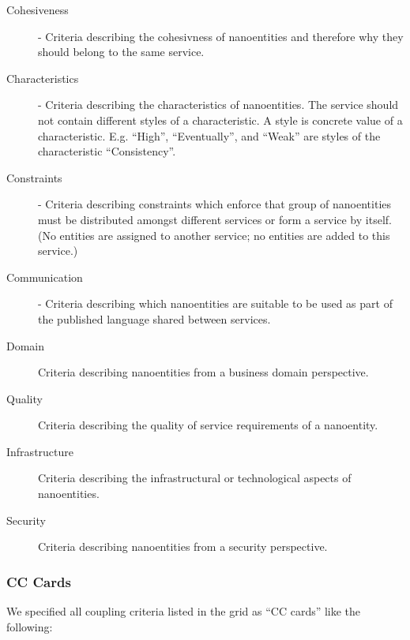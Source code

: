 \begin{description}
	\item[Cohesiveness] - Criteria describing the cohesivness of nanoentities and  therefore why they should belong to the same service. 
	\item[Characteristics] - Criteria describing the characteristics of nanoentities. The service should not contain different styles of a characteristic. A style is concrete value of a characteristic. E.g. \enquote{High}, \enquote{Eventually}, and \enquote{Weak} are styles of the characteristic \enquote{Consistency}.
	\item[Constraints] - Criteria describing constraints which enforce that group of nanoentities must be distributed amongst different services or form a service by itself. (No entities are assigned to another service; no entities are added to this service.)
	\item[Communication] - Criteria describing which nanoentities are suitable to be used as part of the published language shared between services. 
	\item[Domain] Criteria describing nanoentities from a business domain perspective.
	\item[Quality] Criteria describing the quality of service requirements of a nanoentity.  
	\item[Infrastructure] Criteria describing the infrastructural or technological aspects of nanoentities.
	\item[Security] Criteria describing nanoentities from a security perspective.

\end{description}

\subsubsection{CC Cards}

We specified all coupling criteria listed in the grid as \enquote{CC cards} like the following:

